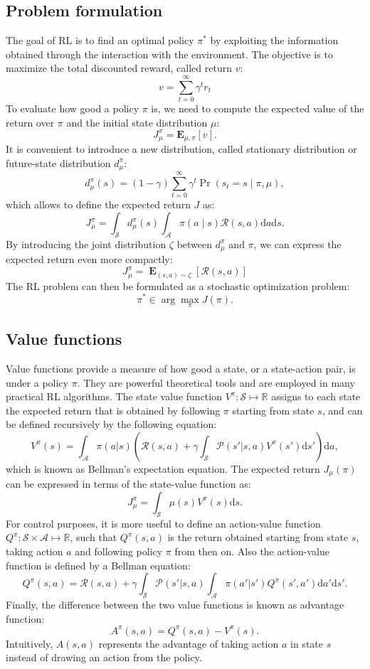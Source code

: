 \subsection{Problem formulation}
The goal of \ac{RL} is to find an optimal policy $\pi^*$ by exploiting the information obtained through the interaction with the environment. The objective is to maximize the total discounted reward, called return $v$:
\[
	v = \sum_{t=0}^{\infty}\gamma^tr_{t}
\]
To evaluate how good a policy $\pi$ is, we need to compute the expected value of the return over $\pi$ and the initial state distribution $\mu$:
\[
	J_\mu^\pi = \mathbf{E}_{\mu,\pi}[v].
\]
It is convenient to introduce a new distribution, called stationary distribution or future-state distribution $d_{\mu}^{\pi}$:
\[
	d_{\mu}^{\pi}(s) = (1-\gamma)\sum_{t=0}^{\infty}\gamma^t\Pr(s_t=s\mid\pi,\mu),
\] 
which allows to define the expected return $J$ as:
\[
	J_\mu^\pi = \int_{\mathcal{S}}d_{\mu}^{\pi}(s)\int_{\mathcal{A}}\pi(a \mid s)\mathcal{R}(s,a)\mathrm{d}a\mathrm{d}s.
\]
By introducing the joint distribution $\zeta$ between $d_{\mu}^{\pi}$ and $\pi$, we can express the expected return even more compactly:
\[
	J_\mu^\pi = \mathop{\mathbf{E}}_{(s,a)\sim\zeta}\left[\mathcal{R}(s,a)\right]
\]
The \ac{RL} problem can then be formulated as a stochastic optimization problem:
\[
	\pi^* \in \arg\max\limits_{\pi}J(\pi).
\]


\subsection{Value functions}
Value functions provide a measure of how good a state, or a state-action pair, is under a policy $\pi$. They are powerful theoretical tools and are employed in many practical \ac{RL} algorithms.
The state value function $V^\pi \colon \mathcal{S} \mapsto \mathbb{R}$ assigns to each state the expected return that is obtained by following $\pi$ starting from state $s$, and can be defined recursively by the following equation:
\[
	V^{\pi}(s) = \int_{\mathcal{A}}\pi(a|s)\left(\mathcal{R}(s,a) + 
		\gamma\int_{\mathcal{S}}\mathcal{P}(s'|s,a)V^{\pi}(s')\mathrm{d}s'\right)\mathrm{d}a,
\]
which is known as Bellman's expectation equation.
The expected return $J_\mu(\pi)$ can be expressed in terms of the state-value function as:
\[
	J_{\mu}^{\pi} = \int_{\mathcal{S}}\mu(s)V^{\pi}(s)\mathrm{d}s.
\]
For control purposes, it is more useful to define an action-value function $Q^\pi \colon \mathcal{S} \times \mathcal{A} \mapsto \mathbb{R}$, such that $Q^\pi(s,a)$ is the return obtained starting from state $s$, taking action $a$ and following policy $\pi$ from then on. Also the action-value function is defined by a Bellman equation:
\[
	Q^{\pi}(s,a) = \mathcal{R}(s,a) + \gamma\int_{\mathcal{S}}\mathcal{P}(s'|s,a)
		\int_{\mathcal{A}}\pi(a'|s')Q^{\pi}(s',a')\mathrm{d}a'\mathrm{d}s'.
\]
Finally, the difference between the two value functions is known as advantage function:
\[
	A^{\pi}(s,a) = Q^{\pi}(s,a) - V^{\pi}(s).
\]
Intuitively, $A(s,a)$ represents the advantage of taking action $a$ in state $s$ instead of drawing an action from the policy.

